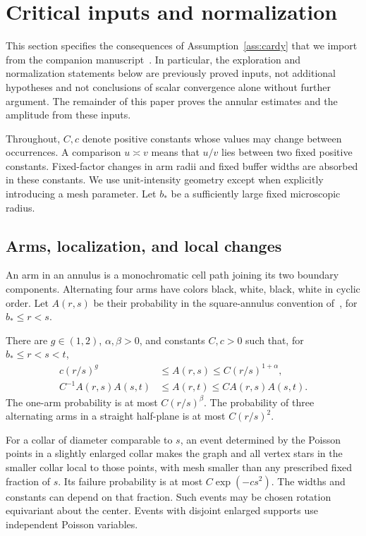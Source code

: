 \section{Critical inputs and normalization}\label{sec:inputs}

This section specifies the consequences of Assumption~\ref{ass:cardy}
that we import from the companion manuscript~\cite{V}. In particular,
the exploration and normalization statements below are previously
proved inputs, not additional hypotheses and not conclusions of scalar
convergence alone without further argument. The remainder of this paper
proves the annular estimates and the amplitude from these inputs.

Throughout, $C,c$ denote positive constants whose values may change
between occurrences. A comparison $u\asymp v$ means that $u/v$ lies
between two fixed positive constants. Fixed-factor changes in arm
radii and fixed buffer widths are absorbed in these constants. We use
unit-intensity geometry except when explicitly introducing a mesh
parameter. Let $b_*$ be a sufficiently large fixed microscopic radius.

\subsection{Arms, localization, and local changes}
An arm in an annulus is a monochromatic cell path joining its two
boundary components. Alternating four arms have colors black, white,
black, white in cyclic order. Let $A(r,s)$ be their probability in the
square-annulus convention of~\cite{V}, for $b_*\le r<s$.

\begin{proposition}\label{in:arms}
There are $g\in(1,2)$, $\alpha,\beta>0$, and constants $C,c>0$ such
that, for $b_*\le r<s<t$,
\begin{align}
 c(r/s)^g&\le A(r,s)\le C(r/s)^{1+\alpha},\label{in:power}\\
 C^{-1}A(r,s)A(s,t)&\le A(r,t)\le C A(r,s)A(s,t).
 \label{in:quasimult}
\end{align}
The one-arm probability is at most $C(r/s)^\beta$. The probability of
three alternating arms in a straight half-plane is at most
$C(r/s)^2$.

For a collar of diameter comparable to $s$, an event determined by the
Poisson points in a slightly enlarged collar makes the graph and all
vertex stars in the smaller collar local to those points, with mesh
smaller than any prescribed fixed fraction of $s$. Its failure
probability is at most $C\exp(-cs^2)$. The widths and constants can
depend on that fraction. Such events may be chosen rotation equivariant
about the center. Events with disjoint enlarged supports use independent
Poisson variables.
\end{proposition}

